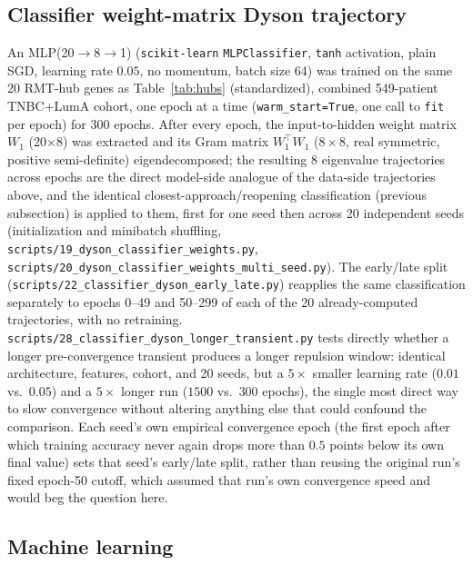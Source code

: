 \documentclass[11pt]{article}
\begin{document}
\subsection{Classifier weight-matrix Dyson trajectory}
\label{sec:classifier-dyson-methods}

An MLP(20$\to$8$\to$1) (\texttt{scikit-learn} \texttt{MLPClassifier},
\texttt{tanh} activation, plain SGD, learning rate $0.05$, no momentum,
batch size 64) was trained on the same 20 RMT-hub genes as
Table~\ref{tab:hubs} (standardized), combined 549-patient TNBC+LumA
cohort, one epoch at a time (\texttt{warm\_start=True}, one call to
\texttt{fit} per epoch) for 300 epochs. After every epoch, the
input-to-hidden weight matrix $W_1$ (20$\times$8) was extracted and its
Gram matrix $W_1^\top W_1$ ($8\times8$, real symmetric, positive
semi-definite) eigendecomposed; the resulting 8 eigenvalue trajectories
across epochs are the direct model-side analogue of the data-side
trajectories above, and the identical closest-approach/reopening
classification (previous subsection) is applied to them, first for one
seed then across 20 independent seeds (initialization and minibatch
shuffling, \texttt{scripts/19\_dyson\_classifier\_weights.py},
\texttt{scripts/20\_dyson\_classifier\_weights\_multi\_seed.py}). The
early/late split (\texttt{scripts/22\_classifier\_dyson\_early\_late.py})
reapplies the same classification separately to epochs 0--49 and
50--299 of each of the 20 already-computed trajectories, with no
retraining. \texttt{scripts/28\_classifier\_dyson\_longer\_transient.py}
tests directly whether a longer pre-convergence transient produces a
longer repulsion window: identical architecture, features, cohort, and
20 seeds, but a $5\times$ smaller learning rate ($0.01$ vs.\ $0.05$)
and a $5\times$ longer run ($1500$ vs.\ $300$ epochs), the single most
direct way to slow convergence without altering anything else that
could confound the comparison. Each seed's own empirical convergence
epoch (the first epoch after which training accuracy never again drops
more than $0.5$ points below its own final value) sets that seed's
early/late split, rather than reusing the original run's fixed
epoch-50 cutoff, which assumed that run's own convergence speed and
would beg the question here.

\subsection{Machine learning}
\end{document}
